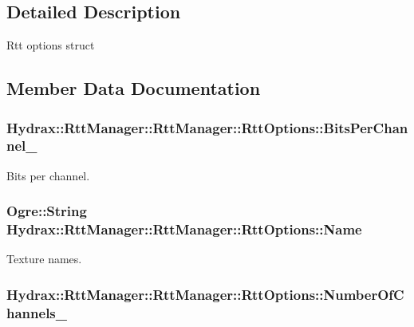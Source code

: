 \subsection{Detailed Description}
Rtt options struct 

\subsection{Member Data Documentation}
\hypertarget{struct_hydrax_1_1_rtt_manager_1_1_rtt_options_21073bf01e408cfbd5ee143195f34486}{
\subsubsection[{BitsPerChannel\_\-}]{ Hydrax::RttManager::RttManager::RttOptions::BitsPerChannel\_\-}}
\label{struct_hydrax_1_1_rtt_manager_1_1_rtt_options_21073bf01e408cfbd5ee143195f34486}


Bits per channel. 

\hypertarget{struct_hydrax_1_1_rtt_manager_1_1_rtt_options_cd14075f58ea5d9b4552642dca6537f9}{
\subsubsection[{Name}]{\setlength{\rightskip}{0pt plus 5cm}Ogre::String Hydrax::RttManager::RttManager::RttOptions::Name}}
\label{struct_hydrax_1_1_rtt_manager_1_1_rtt_options_cd14075f58ea5d9b4552642dca6537f9}


Texture names. 

\hypertarget{struct_hydrax_1_1_rtt_manager_1_1_rtt_options_cd5c7e81620666f51aa69d319f3f1790}{
\subsubsection[{NumberOfChannels\_\-}]{ Hydrax::RttManager::RttManager::RttOptions::NumberOfChannels\_\-}}
\label{struct_hydrax_1_1_rtt_manager_1_1_rtt_options_cd5c7e81620666f51aa69d319f3f1790}



